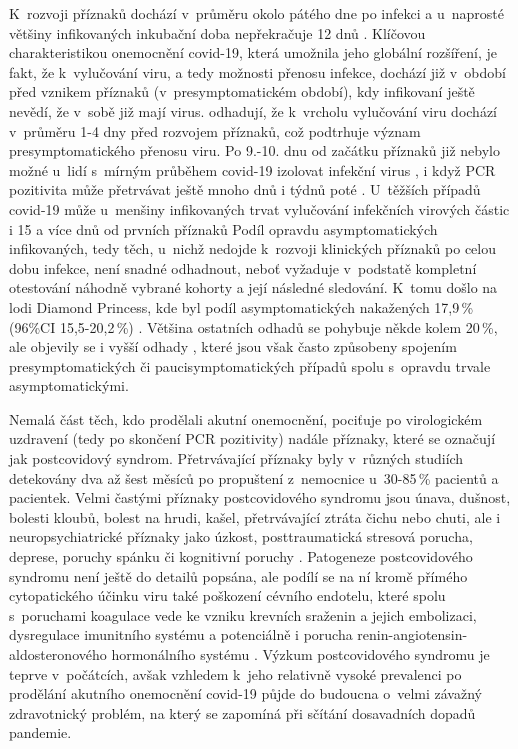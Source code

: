 K~rozvoji příznaků dochází v~průměru okolo pátého dne po infekci \cite{Zhang:2020,Xie:2020} a u~naprosté většiny infikovaných inkubační doba nepřekračuje 12 dnů \cite{Wiersinga:2020}. Klíčovou charakteristikou onemocnění covid-19, která umožnila jeho globální rozšíření, je fakt, že k~vylučování viru, a tedy možnosti přenosu infekce, dochází již v~období před vznikem příznaků (v~presymptomatickém období), kdy infikovaní ještě nevědí, že v~sobě již mají virus. \cite{Jones:2021} odhadují, že k~vrcholu vylučování viru dochází v~průměru 1-4 dny před rozvojem příznaků, což podtrhuje význam presymptomatického přenosu viru. Po 9.-10. dnu od začátku příznaků již nebylo možné u~lidí s~mírným průběhem covid-19 izolovat infekční virus \cite{Wolfel:2020,Jones:2021}, 
i když PCR pozitivita může přetrvávat ještě mnoho dnů i týdnů poté \cite{Byrne:2020}. U~těžších případů covid-19 může u~menšiny infikovaných trvat vylučování infekčních virových částic i 15 a více dnů od prvních příznaků \cite{Kampen:2021} Podíl opravdu asymptomatických infikovaných, tedy těch, u~nichž nedojde k~rozvoji klinických příznaků po celou dobu infekce, není snadné odhadnout, neboť vyžaduje v~podstatě kompletní otestování náhodně vybrané kohorty a její následné sledování. K~tomu došlo na lodi Diamond Princess, kde byl podíl asymptomatických nakažených 17,9\,\% (96\%CI 15,5-20,2\,\%) \cite{Mizumoto:2020}. Většina ostatních odhadů se pohybuje někde kolem 20\,\%, ale objevily se i vyšší odhady \cite{Yanes-Lane:2020}, které jsou však často způsobeny spojením presymptomatických či paucisymptomatických případů spolu s~opravdu trvale asymptomatickými.

Nemalá část těch, kdo prodělali akutní onemocnění, pociťuje po virologickém uzdravení (tedy po skončení PCR pozitivity) nadále příznaky, které se označují jak postcovidový syndrom. Přetrvávající příznaky byly v~různých studiích detekovány dva až šest měsíců po propuštení z~nemocnice u~30-85\,\% pacientů a pacientek. Velmi častými příznaky postcovidového syndromu jsou únava, dušnost, bolesti kloubů, bolest na hrudi, kašel, přetrvávající ztráta čichu nebo chuti, ale i neuropsychiatrické příznaky jako úzkost, posttraumatická stresová porucha, deprese, poruchy spánku či kognitivní poruchy \cite{Nalbandian:2021}. Patogeneze postcovidového syndromu není ještě do detailů popsána, ale podílí se na ní kromě přímého cytopatického účinku viru také poškození cévního endotelu, které spolu s~poruchami koagulace vede ke vzniku krevních sraženin a jejich embolizaci, dysregulace imunitního systému a potenciálně i porucha renin-angiotensin-aldosteronového hormonálního systému \cite{Gupta:2020}. Výzkum postcovidového syndromu je teprve v~počátcích, avšak vzhledem k~jeho relativně vysoké prevalenci po prodělání akutního onemocnění covid-19 půjde do budoucna o~velmi závažný zdravotnický problém, na který se zapomíná při sčítání dosavadních dopadů pandemie.

